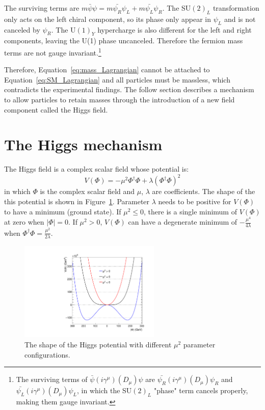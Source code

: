 The surviving terms are $m\bar{\psi} \psi = m\bar{\psi_{R}}\psi_{L} + m\bar{\psi_{L}}\psi_{R}$.
The SU$(2)_{L}$ transformation only acts on the left chiral component,
so its phase only appear in $\psi_{L}$ and is not canceled by $\psi_{R}$.
The U$(1)_{Y}$ hypercharge is also different for the left and right components,
leaving the U(1) phase uncanceled.
Therefore the fermion mass terms are not gauge invariant.\footnote{The surviving terms of $\bar{\psi} (i\gamma^{\mu})(D_{\mu})\psi$
are $\bar{\psi_{R}} (i\gamma^{\mu})(D_{\mu})\psi_{R}$ and $\bar{\psi_{L}} (i\gamma^{\mu})(D_{\mu})\psi_{L}$, 
in which the SU$(2)_{L}$ "phase" term cancels properly, making them gauge invariant.}

Therefore, Equation~\ref{eq:mass_Lagrangian} cannot be attached to Equation~\ref{eq:SM_Lagrangian} and all particles must be massless,
which contradicts the experimental findings.
The follow section describes a mechanism to allow particles to retain masses 
through the introduction of a new field component called the Higgs field.


\section{The Higgs mechanism}\label{sec:Higgs_mech}

The Higgs field is a complex scalar field whose potential is:
\begin{equation} \label{eq:Higgs_potential}
    V(\Phi) = - \mu^{2} \Phi^{\dagger}\Phi + \lambda(\Phi^{\dagger}\Phi)^{2}
\end{equation}
in which $\Phi$ is the complex scalar field and $\mu$, $\lambda$ are coefficients.
The shape of the this potential is shown in Figure~\ref{fig:Higgs_potential}. 
Parameter $\lambda$ needs to be positive for $V(\Phi)$ to have a minimum (ground state).
If $\mu^{2} \leqslant 0$, there is a single minimum of $V(\Phi)$ at zero when $|\Phi| = 0$.
If $\mu^{2} > 0$, $V(\Phi)$ can have a degenerate minimum of $-\frac{\mu^{4}}{4\lambda}$ when $\Phi^{\dagger}\Phi = \frac{\mu^{2}}{2\lambda}$.

\begin{figure}[!htb]
  \centering
  \captionsetup{justification=justified}
  \includegraphics[width=0.6\textwidth]{pics/Intro/Higgs_field.pdf}
  \caption{The shape of the Higgs potential with different $\mu^{2}$ parameter configurations.}
  \label{fig:Higgs_potential}
\end{figure}


